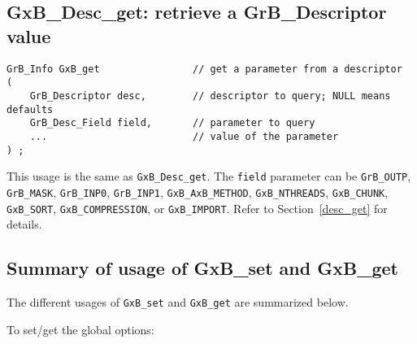 \documentclass[12pt]{article}
\begin{document}
{\newpage
\subsection{{\sf GxB\_Desc\_get:} retrieve a {\sf GrB\_Descriptor} value}

\begin{mdframed}[userdefinedwidth=6in]
{\footnotesize
\begin{verbatim}
GrB_Info GxB_get                // get a parameter from a descriptor
(
    GrB_Descriptor desc,        // descriptor to query; NULL means defaults
    GrB_Desc_Field field,       // parameter to query
    ...                         // value of the parameter
) ;
\end{verbatim} } \end{mdframed}

This usage is the same as \verb'GxB_Desc_get'.  The \verb'field' parameter can
be \verb'GrB_OUTP', \verb'GrB_MASK', \verb'GrB_INP0', \verb'GrB_INP1',
\verb'GxB_AxB_METHOD',
\verb'GxB_NTHREADS',
\verb'GxB_CHUNK',
\verb'GxB_SORT',
\verb'GxB_COMPRESSION', or
\verb'GxB_IMPORT'.
Refer to Section~\ref{desc_get} for details.

\subsection{Summary of usage of {\sf GxB\_set} and {\sf GxB\_get}}

The different usages of \verb'GxB_set' and \verb'GxB_get' are summarized below.

\noindent
To set/get the global options:

}
\end{document}
